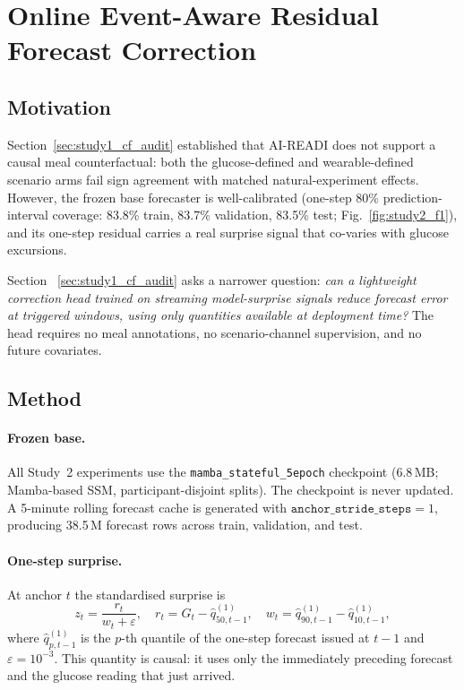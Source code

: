 \section{ Online Event-Aware Residual Forecast Correction}
\label{sec:study2}

\subsection{Motivation}
\label{subsec:study2_motivation}

Section~\ref{sec:study1_cf_audit} established that AI-READI does not
support a causal meal counterfactual: both the glucose-defined and
wearable-defined scenario arms fail sign agreement with matched
natural-experiment effects.
However, the frozen base forecaster is well-calibrated (one-step 80\%
prediction-interval coverage: 83.8\% train, 83.7\% validation, 83.5\% test;
Fig.~\ref{fig:study2_f1}), and its one-step residual carries a real surprise
signal that co-varies with glucose excursions.

Section ~\ref{sec:study1_cf_audit}  asks a narrower question:
\emph{can a lightweight correction head trained on streaming model-surprise
signals reduce forecast error at triggered windows, using only quantities
available at deployment time?}
The head requires no meal annotations, no scenario-channel supervision,
and no future covariates.

\subsection{Method}
\label{subsec:study2_method}

\paragraph{Frozen base.}
All Study~2 experiments use the \texttt{mamba\_stateful\_5epoch} checkpoint
(6.8\,MB; Mamba-based SSM, participant-disjoint splits).
The checkpoint is never updated.
A 5-minute rolling forecast cache is generated with
$\mathtt{anchor\_stride\_steps}=1$, producing 38.5\,M forecast rows across
train, validation, and test.

\paragraph{One-step surprise.}
At anchor $t$ the standardised surprise is
\begin{equation}
  z_t = \frac{r_t}{w_t + \varepsilon},
  \quad
  r_t = G_t - \hat{q}_{50,t-1}^{(1)},
  \quad
  w_t = \hat{q}_{90,t-1}^{(1)} - \hat{q}_{10,t-1}^{(1)},
  \label{eq:s2_zt}
\end{equation}
where $\hat{q}_{p,t-1}^{(1)}$ is the $p$-th quantile of the one-step
forecast issued at $t-1$ and $\varepsilon=10^{-3}$.
This quantity is causal: it uses only the immediately preceding forecast
and the glucose reading that just arrived.

